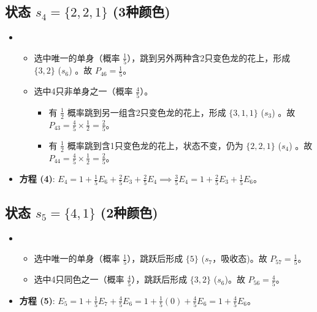 \documentclass[UTF8]{ctexart}
\begin{document}
\subsection*{状态 $s_4 = \{2, 2, 1\}$ (3种颜色)}
\begin{itemize}
    \item 
        \begin{itemize}
            \item 选中唯一的单身（概率 $\frac{1}{5}$），跳到另外两种含2只变色龙的花上，形成 $\{3,2\}$ ($s_6$) 。故 $P_{46} = \frac{1}{5}$。
            \item 选中4只非单身之一（概率 $\frac{4}{5}$）。
                \begin{itemize}
                    \item 有 $\frac{1}{2}$ 概率跳到另一组含2只变色龙的花上，形成 $\{3,1,1\}$ ($s_3$) 。故 $P_{43} = \frac{4}{5} \times \frac{1}{2} = \frac{2}{5}$。
                    \item 有 $\frac{1}{2}$ 概率跳到含1只变色龙的花上，状态不变，仍为 $\{2,2,1\}$ ($s_4$) 。故 $P_{44} = \frac{4}{5} \times \frac{1}{2} = \frac{2}{5}$。
                \end{itemize}
        \end{itemize}
    \item \textbf{方程 (4)}: $E_4 = 1 + \frac{1}{5}E_6 + \frac{2}{5}E_3 + \frac{2}{5}E_4 \implies \frac{3}{5}E_4 = 1 + \frac{2}{5}E_3 + \frac{1}{5}E_6$。
\end{itemize}

\subsection*{状态 $s_5 = \{4, 1\}$ (2种颜色)}
\begin{itemize}
    \item 
        \begin{itemize}
            \item 选中唯一的单身（概率 $\frac{1}{5}$），跳跃后形成 $\{5\}$ ($s_7$，吸收态)。故 $P_{57} = \frac{1}{5}$。
            \item 选中4只同色之一（概率 $\frac{4}{5}$），跳跃后形成 $\{3,2\}$ ($s_6$)。故 $P_{56} = \frac{4}{5}$。
        \end{itemize}
    \item \textbf{方程 (5)}: $E_5 = 1 + \frac{1}{5}E_7 + \frac{4}{5}E_6 = 1 + \frac{1}{5}(0) + \frac{4}{5}E_6 = 1 + \frac{4}{5}E_6$。
\end{itemize}
\end{document}
